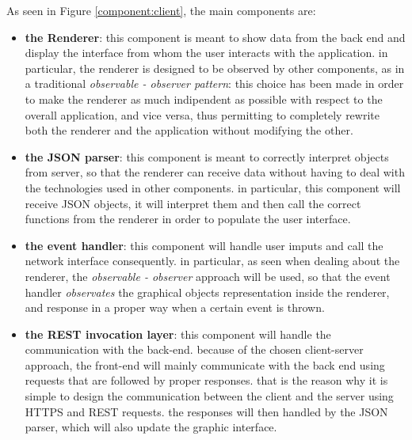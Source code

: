 As seen in Figure \ref{component:client}, the main components are:
\begin{itemize}
    \item \textbf{the Renderer}: this component is meant to show data from the back end and display the interface from whom the user interacts with the application.
                                 in particular, the renderer is designed to be observed by other components, as in a traditional \emph{observable - observer pattern}:
                                 this choice has been made in order to make the renderer as much indipendent as possible with respect to the overall application, and
                                 vice versa, thus permitting to completely rewrite both the renderer and the application without modifying the other. 
                    
    \item \textbf{the JSON parser}: this component is meant to correctly interpret objects from server, so that the renderer can receive data without having to deal
                                    with the technologies used in other components. in particular, this component will receive JSON objects, it will interpret them and
                                    then call the correct functions from the renderer in order to populate the user interface.
                                    
    \item \textbf{the event handler}: this component will handle user imputs and call the network interface consequently. in particular, as seen when dealing about the 
                                      renderer, the \emph{observable - observer} approach will be used, so that the event handler \emph{observates} the graphical objects
                                      representation inside the renderer, and response in a proper way when a certain event is thrown.
                        
    \item \textbf{the REST invocation layer}: this component will handle the communication with the back-end. because of the chosen client-server approach, the front-end
                                              will mainly communicate with the back end using requests that are followed by proper responses. that is the reason why it is 
                                              simple to design the communication between the client and the server using HTTPS and REST requests. the responses will then 
                                              handled by the JSON parser, which will also update the graphic interface.
\end{itemize}


